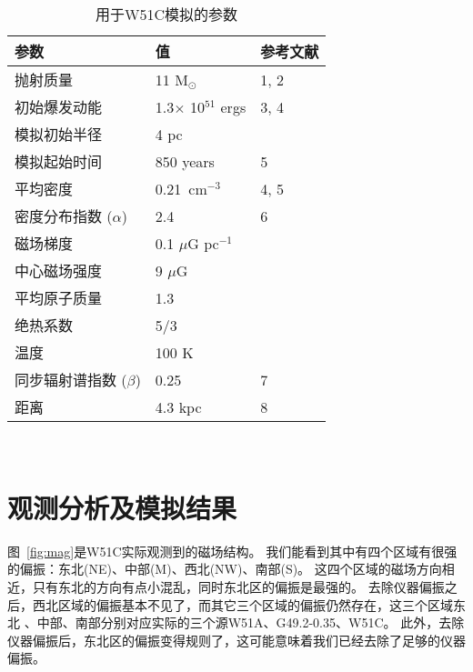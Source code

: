 \begin{table*}
  \caption{用于W51C模拟的参数}
  \label{table:parameters}
  \centering
  \begin{tabular}{l l l}
      \hline\hline
      参数                         & 值              & 参考文献               \\
      \hline
      抛射质量                      & 11 M$_{\odot}$ & 1, 2\\
      初始爆发动能                  & 1.3$\times$ 10$^{51}$ ergs & 3, 4\\
      模拟初始半径                  & 4 pc            &\\
      模拟起始时间                  & 850 years       & 5\\
      \hline
      平均密度                      & 0.21\ cm$^{-3}$ & 4, 5\\
      密度分布指数 ($\alpha$)       & 2.4             & 6\\
      磁场梯度                      & 0.1 $\mu$G pc$^{-1}$    &\\
      中心磁场强度                  & 9 $\mu$G        &\\
      平均原子质量                  & 1.3             &\\
      绝热系数                      & 5/3             &\\
      温度                         & 100 K           &\\
      \hline
      同步辐射谱指数 ($\beta$)       & 0.25            & 7\\
      距离                          & 4.3 kpc         & 8\\
      \hline
  \end{tabular}\\
\end{table*}




\section{观测分析及模拟结果}
\label{W51Cres}

图~\ref{fig:mag}是W51C实际观测到的磁场结构。
我们能看到其中有四个区域有很强的偏振：东北(NE)、中部(M)、西北(NW)、南部(S)。
这四个区域的磁场方向相近，只有东北的方向有点小混乱，同时东北区的偏振是最强的。
去除仪器偏振之后，西北区域的偏振基本不见了，而其它三个区域的偏振仍然存在，这三个区域东北
、中部、南部分别对应实际的三个源W51A、G49.2-0.35、W51C。
此外，去除仪器偏振后，东北区的偏振变得规则了，这可能意味着我们已经去除了足够的仪器偏振。


